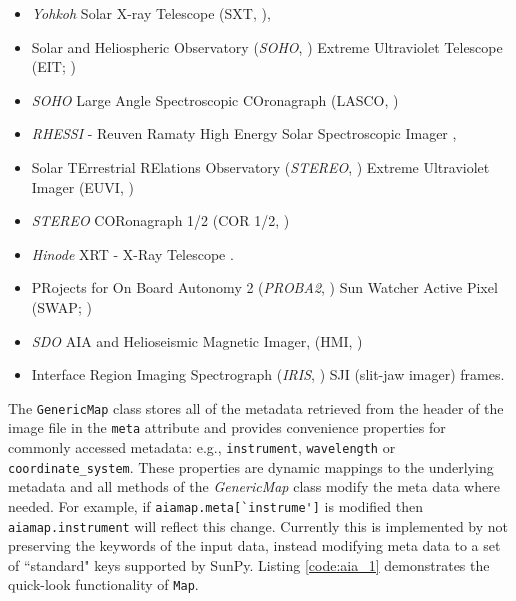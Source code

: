 \begin{itemize}
\item \textit{Yohkoh} Solar X-ray Telescope (SXT, \citealp{1991SoPh..136....1O, 1991SoPh..136...37T}),
\item Solar and Heliospheric Observatory (\textit{SOHO}, \citealp{domingo1995}) Extreme Ultraviolet Telescope (EIT; \citealp{1995SoPh..162..291D})
\item \textit{SOHO} Large Angle Spectroscopic COronagraph (LASCO, \citealp{1995SoPh..162..357B})
\item \textit{RHESSI} - Reuven Ramaty High Energy Solar Spectroscopic Imager \citep{2002SoPh..210....3L},
\item Solar TErrestrial RElations Observatory (\textit{STEREO}, \citealp{2005AdSpR..36.1483K}) Extreme Ultraviolet Imager (EUVI, \citep{2004SPIE.5171..111W})
\item \textit{STEREO} CORonagraph 1/2 (COR 1/2, \citealp{2002AdSpR..29.2017H})
\item \textit{Hinode} XRT - X-Ray Telescope \citep{2007SoPh..243....3K, 2007SoPh..243...63G}.
\item PRojects for On Board Autonomy 2 (\textit{PROBA2}, \citealp{2013SoPh..286....5S}) Sun Watcher Active Pixel (SWAP; \citealp{2013SoPh..286...43S})
\item \textit{SDO} AIA and Helioseismic Magnetic Imager, (HMI, \citealp{2012SoPh..275..207S})
\item Interface Region Imaging Spectrograph (\textit{IRIS}, \citealp{2011SPD....42.1512L}) SJI (slit-jaw imager) frames.           
\end{itemize}
             
The \texttt{GenericMap} class stores all of the metadata retrieved from the header of
the image file in the \texttt{meta} attribute and provides convenience 
properties for commonly accessed metadata: e.g., \texttt{instrument}, 
\texttt{wavelength} or \texttt{coordinate\_system}.
These properties are dynamic mappings to the underlying metadata and all methods 
of the \textit{GenericMap} class modify the meta data where needed.
For example, if \verb|aiamap.meta[`instrume']| is modified then \verb|aiamap.instrument| 
will reflect this change.
Currently this is implemented by not preserving the keywords of the input data,
instead modifying meta data to a set of ``standard" keys supported by SunPy.
Listing \ref{code:aia_1} demonstrates the quick-look functionality of 
\texttt{Map}.

